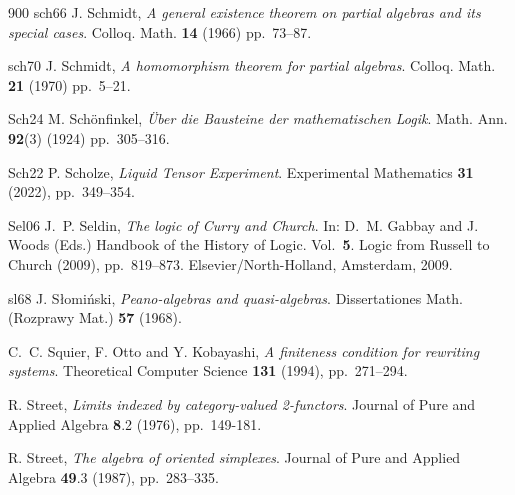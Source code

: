 \begin{thebibliography}{900}
\bibitem%
{sch66} J. Schmidt, \emph{A general existence theorem on partial algebras and its special cases}. Colloq. Math. \textbf{14} (1966) pp.~73--87.

\bibitem%
{sch70} J. Schmidt, \emph{A homomorphism theorem for partial algebras}. Colloq. Math. \textbf{21} (1970) pp.~5--21.

\bibitem%
{Sch24} M. Sch\"{o}nfinkel, \emph{\"{U}ber die Bausteine der mathematischen Logik}. Math. Ann. \textbf{92}(3) (1924) pp.~305--316.


\bibitem%
{Sch22} P. Scholze, \emph{Liquid Tensor Experiment}. Experimental Mathematics \textbf{31} (2022), pp.~349--354.

\bibitem%
{Sel06} J.~P. Seldin, \emph{The logic of Curry and Church}. In: D.~M. Gabbay and J. Woods (Eds.) Handbook of the History of Logic. Vol.~\textbf{5}. Logic from Russell to Church (2009), pp.~819--873. Elsevier/North-Holland, Amsterdam, 2009.

\bibitem%
{sl68} J. S{\l}omi\'{n}ski, \emph{Peano-algebras and quasi-algebras}.
Dissertationes Math. (Rozprawy Mat.) \textbf{57} (1968).


C.~C. Squier, F. Otto and Y. Kobayashi, \emph{A finiteness condition for rewriting systems}. Theoretical Computer Science \textbf{131} (1994), pp.~271--294.

R. Street, \emph{Limits indexed by category-valued 2-functors}. Journal of Pure and Applied Algebra \textbf{8}.2 (1976), pp.~149-181.

R. Street, \emph{The algebra of oriented simplexes}. Journal of Pure and Applied Algebra \textbf{49}.3 (1987), pp.~283--335.



\end{thebibliography}
